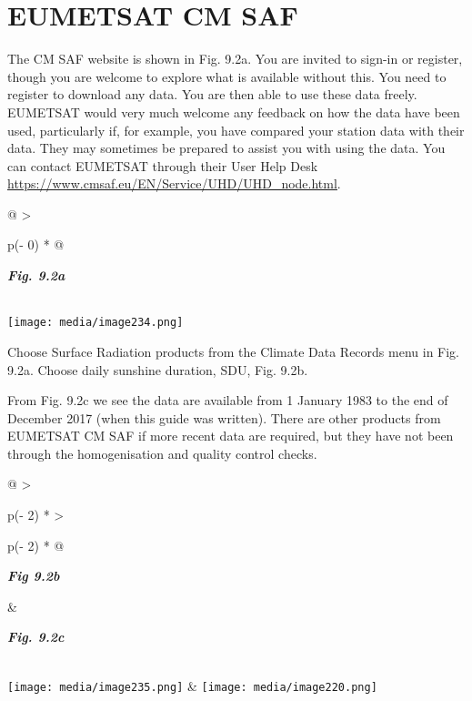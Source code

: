 \documentclass[
  letterpaper,
  DIV=11,
  numbers=noendperiod]{scrreprt}
\begin{document}
\section{EUMETSAT CM SAF}\label{eumetsat-cm-saf}

The CM SAF website is shown in Fig. 9.2a. You are invited to sign-in or
register, though you are welcome to explore what is available without
this. You need to register to download any data. You are then able to
use these data freely. EUMETSAT would very much welcome any feedback on
how the data have been used, particularly if, for example, you have
compared your station data with their data. They may sometimes be
prepared to assist you with using the data. You can contact EUMETSAT
through their User Help Desk
\href{https://www.cmsaf.eu/EN/Service/UHD/UHD_node.html}{\ul{https://www.cmsaf.eu/EN/Service/UHD/UHD\_node.html}}.

\begin{longtable}[]{@{}
  >{\raggedright\arraybackslash}p{(\columnwidth - 0\tabcolsep) * }@{}}
\toprule\noalign{}
\begin{minipage}[b]{\linewidth}\raggedright
\textbf{\emph{Fig. 9.2a}}
\end{minipage} \\
\midrule\noalign{}
\endhead
\bottomrule\noalign{}
\endlastfoot
\texttt{[image: media/image234.png]} \\
\end{longtable}

Choose Surface Radiation products from the Climate Data Records menu in
Fig. 9.2a. Choose daily sunshine duration, SDU, Fig. 9.2b.

From Fig. 9.2c we see the data are available from 1 January 1983 to the
end of December 2017 (when this guide was written). There are other
products from EUMETSAT CM SAF if more recent data are required, but they
have not been through the homogenisation and quality control checks.

\begin{longtable}[]{@{}
  >{\raggedright\arraybackslash}p{(\columnwidth - 2\tabcolsep) * }
  >{\raggedright\arraybackslash}p{(\columnwidth - 2\tabcolsep) * }@{}}
\toprule\noalign{}
\begin{minipage}[b]{\linewidth}\raggedright
\textbf{\emph{Fig 9.2b}}
\end{minipage} & \begin{minipage}[b]{\linewidth}\raggedright
\textbf{\emph{Fig. 9.2c}}
\end{minipage} \\
\midrule\noalign{}
\endhead
\bottomrule\noalign{}
\endlastfoot
\texttt{[image: media/image235.png]} &
\texttt{[image: media/image220.png]} \\
\end{longtable}
\end{document}
